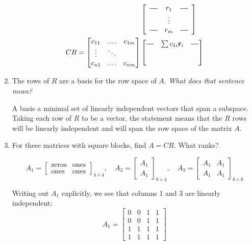 \documentclass{scrartcl}
\newcommand*{\horzbar}{\rule[.5ex]{2.5ex}{0.5pt}}
\begin{document}
\begin{enumerate}
\begin{align*}
&\left[
  \begin{array}{ccc}
  	\horzbar & r_1 & \horzbar \\
  	& \vdots & \\
  	\horzbar & r_m & \horzbar \\
  \end{array}
  \right]\\
CR = \begin{bmatrix} c_{11} & \ldots & c_{1m} \\
		\vdots & \ddots & \\
		c_{n1} & \ldots & c_{nm}\end{bmatrix}& 
	\begin{bmatrix}
		\horzbar & \sum c_{1i}\mathbf{r}_i & \horzbar\\
		& & \\
		& & 
	\end{bmatrix}
\end{align*}

 \item The rows of $R$ are a basis for the row space of $A$. \emph{What does that sentence mean?}

A basis a minimal set of linearly independent vectors that span a subspace. Taking each row of $R$ to be a vector, the statement means that the $R$ rows will be linearly independent and will span the row space of the matrix $A$.

\item For these matrices with square blocks, find $A = CR$. What ranks?

$$A_1 =\begin{bmatrix}
	\text{zeros} & \text{ones} \\
	\text{ones} & \text{ones}
\end{bmatrix}_{4 \times 4}, \quad
A_2 = \begin{bmatrix}
	A_1 \\ A_1
\end{bmatrix}_{8 \times 4}, \quad 
A_3 = \begin{bmatrix}
	A_1 & A_1 \\ A_1 & A_1
\end{bmatrix}_{8 \times 8}$$

Writing out $A_1$ explicitly, we see that columns 1 and 3 are linearly independent:
$$A_1 = \begin{bmatrix}
	0 & 0 & 1 & 1 \\ 0 & 0 & 1 & 1 \\1 & 1 & 1 & 1\\1 & 1 & 1 & 1
\end{bmatrix}$$


\end{enumerate}
\end{document}
